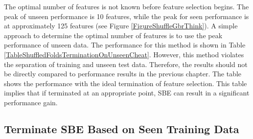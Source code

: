 The optimal number of features is not known before feature selection begins. 
The peak of unseen performance is 10 features, while the peak for seen performance is at approximately 125 features (see Figure \ref{FigureShuffleGbrThink}). A simple approach to determine the optimal number of features is to use the peak performance of unseen data. The performance for this method is shown in Table \ref{TableShuffledFoldsTerminationOnUnseenCheat}. However, this method violates the separation of training and unseen test data. Therefore, the results should not be directly compared to performance results in the previous chapter. The table shows the performance with the ideal termination of feature selection. This table implies that if terminated at an appropriate point, \ac{SBE} can result in a significant performance gain. 

\subsection{Terminate \acs{SBE} Based on Seen Training Data}
\label{SectionFeatureSelectionSeenPeak}


